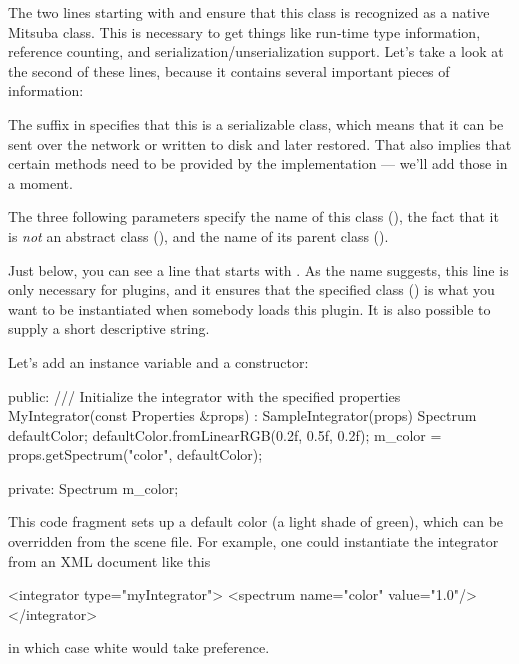 The two lines starting with  and 
ensure that this class is recognized as a native Mitsuba class.
This is necessary to get things like run-time type information, reference counting,
and serialization/unserialization support. Let's take a look at the second of these
lines, because it contains several important pieces of information:

The suffix  in  specifies that this is
a serializable class, which means that it can be sent over the network or 
written to disk and later restored. That also implies that certain methods
need to be provided by the implementation --- we'll add those in a moment.

The three following parameters specify the name of this class (),
the fact that it is \emph{not} an abstract class (), and the name of its
parent class ().

Just below, you can see a line that starts with
. As the name suggests, this line is only necessary
for plugins, and it ensures that the specified class () is 
what you want to be instantiated when somebody loads this plugin. It is also
possible to supply a short descriptive string.
\vspace{3mm}

Let's add an instance variable and a constructor:
\begin{cpp}
public:
    /// Initialize the integrator with the specified properties
    MyIntegrator(const Properties &props) : SampleIntegrator(props) {
        Spectrum defaultColor;
        defaultColor.fromLinearRGB(0.2f, 0.5f, 0.2f);
        m_color = props.getSpectrum("color", defaultColor);
    }

private:
	Spectrum m_color;
\end{cpp}

This code fragment sets up a default color (a light shade of green), which
can be overridden from the scene file. For example, one could instantiate
the integrator from an XML document like this

\begin{xml}
<integrator type="myIntegrator">
	<spectrum name="color" value="1.0"/>
</integrator>
\end{xml}
in which case white would take preference.
\vspace{3mm}

